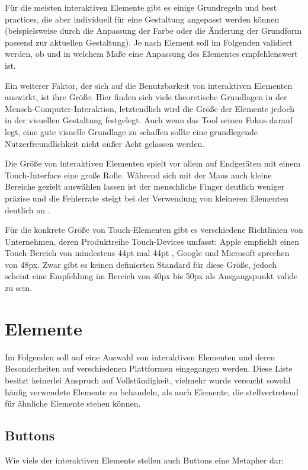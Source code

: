 Für die meisten interaktiven Elemente gibt es einige Grundregeln und best practices, die aber individuell für eine Gestaltung angepasst werden können (beispielsweise durch die Anpassung der Farbe oder die Änderung der Grundform passend zur aktuellen Gestaltung).
Je nach Element soll im Folgenden validiert werden, ob und in welchem Maße eine Anpassung des Elementes empfehlenswert ist.

Ein weiterer Faktor, der sich auf die Benutzbarkeit von interaktiven Elementen auswirkt, ist ihre Größe. Hier finden sich viele theoretische Grundlagen in der Mensch-Computer-Interaktion, letztendlich wird die Größe der Elemente jedoch in der visuellen Gestaltung festgelegt. Auch wenn das Tool seinen Fokus darauf legt, eine gute visuelle Grundlage zu schaffen sollte eine grundlegende Nutzerfreundlichkeit nicht außer Acht gelassen werden.

Die Größe von interaktiven Elementen spielt vor allem auf Endgeräten mit einem Touch-Interface eine große Rolle. Während sich mit der Maus auch kleine Bereiche gezielt auswählen lassen ist der menschliche Finger deutlich weniger präzise und die Fehlerrate steigt bei der Verwendung von kleineren Elementen deutlich an \cite{park2008touch}.

Für die konkrete Größe von Touch-Elementen gibt es verschiedene Richtlinien von Unternehmen, deren Produktreihe Touch-Devices umfasst:
Apple empfiehlt einen Touch-Bereich von mindestens 44pt mal 44pt \cite{apple2016layout}, Google \cite{google2016tap} und Microsoft \cite{microsoft2016traget} sprechen von 48px. Zwar gibt es keinen definierten Standard für diese Größe, jedoch scheint eine Empfehlung im Bereich von 40px bis 50px als Ausgangspunkt valide zu sein.

\section{Elemente}
Im Folgenden soll auf eine Auswahl von interaktiven Elementen und deren Besonderheiten auf verschiedenen Plattformen eingegangen werden. Diese Liste besitzt keinerlei Anspruch auf Vollständigkeit, vielmehr wurde versucht sowohl häufig verwendete Elemente zu behandeln, als auch Elemente, die stellvertretend für ähnliche Elemente stehen können.

\subsection{Buttons}

Wie viele der interaktiven Elemente stellen auch Buttons eine Metapher dar:

